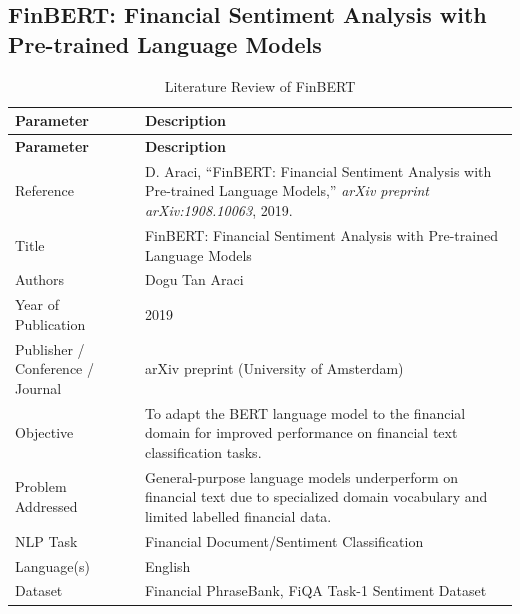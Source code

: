 \subsection{FinBERT: Financial Sentiment Analysis with Pre-trained Language Models}

\def\PaperTitle{FinBERT}
\def\PaperLabel{tab:paper4}

\renewcommand{\arraystretch}{1.4}

\begin{longtable}{|p{5cm}|p{10cm}|}
\caption{Literature Review of FinBERT}
\label{tab:paper4}\\

\hline
\textbf{Parameter} & \textbf{Description} \\
\hline
\endfirsthead

\hline
\textbf{Parameter} & \textbf{Description} \\
\hline
\endhead

Reference &
D. Araci, ``FinBERT: Financial Sentiment Analysis with Pre-trained Language Models,'' \textit{arXiv preprint arXiv:1908.10063}, 2019.
\\ \hline

Title &
FinBERT: Financial Sentiment Analysis with Pre-trained Language Models
\\ \hline

Authors &
Dogu Tan Araci
\\ \hline

Year of Publication &
2019
\\ \hline

Publisher / Conference / Journal &
arXiv preprint (University of Amsterdam)
\\ \hline

Objective &
To adapt the BERT language model to the financial domain for improved performance on financial text classification tasks.
\\ \hline

Problem Addressed &
General-purpose language models underperform on financial text due to specialized domain vocabulary and limited labelled financial data.
\\ \hline

NLP Task &
Financial Document/Sentiment Classification
\\ \hline

Language(s) &
English
\\ \hline

Dataset &
Financial PhraseBank, FiQA Task-1 Sentiment Dataset
\\ \hline


\end{longtable}
